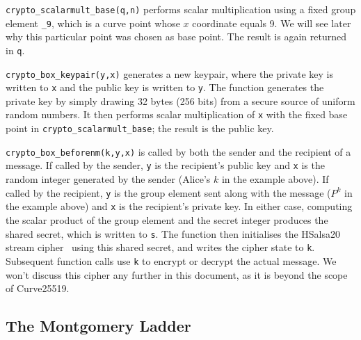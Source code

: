 \documentclass{article}
\begin{document}
\verb|crypto_scalarmult_base(q,n)| performs scalar multiplication using a fixed group element \verb|_9|, which is a curve point whose $x$ coordinate equals 9.
We will see later why this particular point was chosen as base point.
The result is again returned in \verb|q|.

\verb|crypto_box_keypair(y,x)| generates a new keypair, where the private key is written to \verb|x| and the public key is written to \verb|y|.
The function generates the private key by simply drawing 32 bytes (256 bits) from a secure source of uniform random numbers.
It then performs scalar multiplication of \verb|x| with the fixed base point in \verb|crypto_scalarmult_base|; the result is the public key.

\verb|crypto_box_beforenm(k,y,x)| is called by both the sender and the recipient of a message.
If called by the sender, \verb|y| is the recipient's public key and \verb|x| is the random integer generated by the sender (Alice's $k$ in the example above).
If called by the recipient, \verb|y| is the group element sent along with the message ($P^k$ in the example above) and \verb|x| is the recipient's private key.
In either case, computing the scalar product of the group element and the secret integer produces the shared secret, which is written to \verb|s|.
The function then initialises the HSalsa20 stream cipher~\cite{Bernstein:2014ca} using this shared secret, and writes the cipher state to \verb|k|.
Subsequent function calls use \verb|k| to encrypt or decrypt the actual message.
We won't discuss this cipher any further in this document, as it is beyond the scope of Curve25519.

\subsection{The Montgomery Ladder}\label{sec:ladder}
\end{document}
